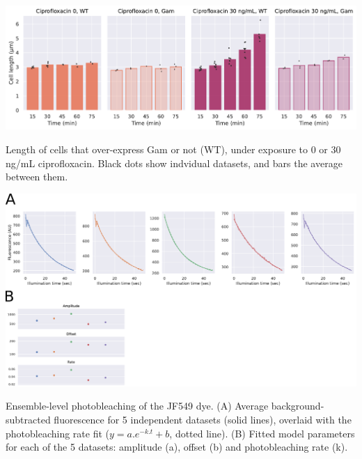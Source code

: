 
\begin{suppfigure*}[htbp]
    \begin{center}
    \includegraphics[width=\linewidth]{SI_Figures/Cell_length_Gam.pdf}
    \end{center}
    \caption{Length of cells that over-express Gam or not (WT), under exposure to 0 or 30 ng/mL ciprofloxacin. Black dots show indvidual datasets, and bars the average between them.}
    \label{SIFig:Gam_cell_length}
\end{suppfigure*}

\begin{suppfigure*}[htbp]
\begin{center}
\includegraphics[width=\textwidth]{SI_Figures/SIFig_bleaching.pdf}
\end{center}
\caption{Ensemble-level photobleaching of the JF549 dye. (A) Average background-subtracted fluorescence for 5 independent datasets (solid lines), overlaid with the photobleaching rate fit ($y=a.e^{-k.t}+b$, dotted line). (B) Fitted model parameters for each of the 5 datasets: amplitude (a), offset (b) and photobleaching rate (k).}
\label{SIFig:dye_bleaching}
\end{suppfigure*}


